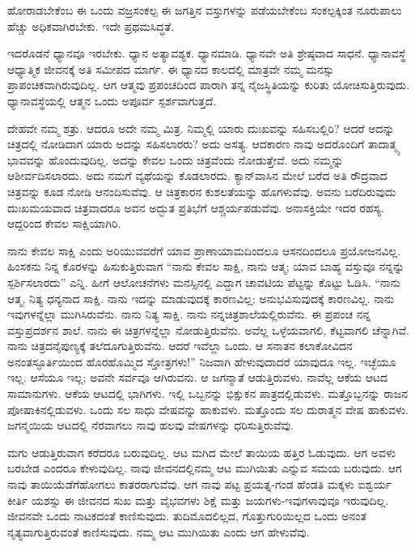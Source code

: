 \vskip 0.1cm

ಹೋರಾಡಬೇಕೆಂಬ ಈ ಒಂದು ವಜ್ರಸಂಕಲ್ಪ ಈ ಜಗತ್ತಿನ ವಸ್ತುಗಳನ್ನು ಪಡೆಯಬೇಕೆಂಬ ಸಂಕಲ್ಪಕ್ಕಿಂತ ನೂರುಪಾಲು ಹೆಚ್ಚು ಅಧಿಕವಾಗಿರಬೇಕು. ಇದೇ ಪ್ರಥಮ\break ಸಿದ್ಧತೆ.

\vskip 0.1cm

ಇದರೊಡನೆ ಧ್ಯಾನವೂ ಇರಬೇಕು. ಧ್ಯಾನ ಅತ್ಯಾವಶ್ಯಕ. ಧ್ಯಾನಮಾಡಿ. ಧ್ಯಾನವೇ ಅತಿ ಶ್ರೇಷ್ಠವಾದ ಸಾಧನೆ. ಧ್ಯಾನಾವಸ್ಥೆ ಆಧ್ಯಾತ್ಮಿಕ ಜೀವನಕ್ಕೆ ಅತಿ ಸಮೀಪದ ಮಾರ್ಗ. ಈ ಧ್ಯಾನದ ಕಾಲದಲ್ಲಿ ಮಾತ್ರವೇ ನಮ್ಮ ಮನಸ್ಸು ಪ್ರಾಪಂಚಿಕವಾಗಿರುವುದಿಲ್ಲ. ಆಗ ಆತ್ಮವು ಪ್ರಪಂಚದಿಂದ ಪಾರಾಗಿ ತನ್ನ ನೈಜಸ್ಥಿತಿಯನ್ನು ಕುರಿತು ಯೋಚಿಸುತ್ತಿರುವುದು. ಧ್ಯಾನಾವಸ್ಥೆಯಲ್ಲಿ ಆತ್ಮನ ಒಂದು ಅಪೂರ್ವ ಸ್ಪರ್ಶವಾಗುತ್ತದೆ.

\eject

ದೇಹವೇ ನಮ್ಮ ಶತ್ರು. ಆದರೂ ಅದೇ ನಮ್ಮ ಮಿತ್ರ. ನಿಮ್ಮಲ್ಲಿ ಯಾರು ದುಃಖವನ್ನು ಸಹಿಸಬಲ್ಲಿರಿ? ಆದರೆ ಅದನ್ನು ಚಿತ್ರದಲ್ಲಿ ನೋಡಿದಾಗ ಯಾರು ಅದನ್ನು ಸಹಿಸಲಾರರು? ಅದು ಅಸತ್ಯ. ಆದಕಾರಣ ನಾವು ಅದರೊಂದಿಗೆ ತಾದಾತ್ಮ್ಯ ಭಾವವನ್ನು ಹೊಂದುವುದಿಲ್ಲ. ಅದನ್ನು ಕೇವಲ ಒಂದು ಚಿತ್ರವೆಂದು ನೋಡುತ್ತೇವೆ. ಅದು ನಮ್ಮನ್ನು ಆಶೀರ್ವದಿಸಲಾರದು. ಅದು ನಮಗೆ ವ್ಯಥೆಯನ್ನು ಕೊಡಲಾರದು. ಕ್ಯಾನ್​ವಾಸಿನ ಮೇಲೆ ಬರೆದ ಅತಿ ರೌದ್ರವಾದ ಚಿತ್ರವನ್ನು ಕೂಡ ನೋಡಿ ಆನಂದಿಸುವೆವು. ಆ ಚಿತ್ರಕಾರನ ಕುಶಲತೆಯನ್ನು ಹೊಗಳುವೆವು. ಅವನು ಬರೆದಿರುವುದು ದುಃಖಮಯವಾದ ಚಿತ್ರವಾದರೂ ಅವನ ಅದ್ಭುತ ಪ್ರತಿಭೆಗೆ ಆಶ್ಚರ್ಯಪಡುವೆವು. ಅನಾಸಕ್ತಿಯೇ ಇದರ ರಹಸ್ಯ. ಆದ್ದರಿಂದ ಕೇವಲ ಸಾಕ್ಷಿಯಾಗಿರಿ.

\vskip 0.1cm

ನಾನು ಕೇವಲ ಸಾಕ್ಷಿ ಎಂದು ಅರಿಯುವವರೆಗೆ ಯಾವ ಪ್ರಾಣಾಯಾಮದಿಂದಲೂ ಆಸನದಿಂದಲೂ ಪ್ರಯೋಜನವಿಲ್ಲ. ಹಿಂಸಕನು ನಿನ್ನ ಕೊರಳನ್ನು ಹಿಸುಕುತ್ತಿರುವಾಗ “ನಾನು ಕೇವಲ ಸಾಕ್ಷಿ, ನಾನು ಆತ್ಮ; ಯಾವ ಬಾಹ್ಯ ವಸ್ತುವೂ ನನ್ನನ್ನು ಸ್ಪರ್ಶಿಸಲಾರದು” ಎನ್ನಿ. ಹೀಗೆ ಆಲೋಚನೆಗಳು ಮನಸ್ಸಿನಲ್ಲಿ ಎದ್ದಾಗ ಚಾವಟಿಯ ಪೆಟ್ಟನ್ನು ಕೊಟ್ಟು ಓಡಿಸಿ. “ನಾನು ಆತ್ಮ, ನಿತ್ಯ ಧನ್ಯನಾದ ಸಾಕ್ಷಿ. ನಾನು ಇದನ್ನು ಮಾಡುವುದಕ್ಕೆ ಕಾರಣವಿಲ್ಲ; ಅನುಭವಿಸುವು\break ದಕ್ಕೆ ಕಾರಣವಿಲ್ಲ. ನಾನು ಇವುಗಳನ್ನೆಲ್ಲಾ ಮುಗಿಸಿರುವೆನು. ನಾನು ನಿತ್ಯ ಸಾಕ್ಷಿ. ನಾನು ನನ್ನ\break ಚಿತ್ರಶಾಲೆಯಲ್ಲಿರುವೆನು. ಈ ಪ್ರಪಂಚ ನನ್ನ ವಸ್ತುಪ್ರದರ್ಶನ ಶಾಲೆ. ನಾನು ಈ ಚಿತ್ರಗಳ\break ನ್ನೆಲ್ಲಾ ನೋಡುತ್ತಿರುವೆನು. ಅವೆಲ್ಲ ಒಳ್ಳೆಯವಾಗಲಿ, ಕೆಟ್ಟವಾಗಲಿ ಚೆನ್ನಾಗಿವೆ. ನಾನು ಚಿತ್ರದ\break ನೈಪುಣ್ಯಕ್ಕೆ ತಲೆದೂಗುತ್ತಿರುವೆನು. ಆದರೆ ಇವೆಲ್ಲಾ ಒಂದು. ಆ ಸನಾತನ ಕಲಾಕೋವಿದನ ಅನಂತಸ್ಫೂರ್ತಿಯಿಂದ ಹೊರಹೊಮ್ಮಿದ ಸ್ತೋತ್ರಗಳು!” ನಿಜವಾಗಿ ಹೇಳುವುದಾದರೆ ಯಾವುದೂ ಇಲ್ಲ. ಇಚ್ಛೆಯೂ ಇಲ್ಲ. ಆಸೆಯೂ ಇಲ್ಲ; ಅವನೇ ಸರ್ವವೂ ಆಗಿರುವನು. ಆ ಜಗನ್ಮಾತೆ ಆಡುತ್ತಿರುವಳು. ನಾವೆಲ್ಲ ಆಕೆಯ ಆಟದ ಸಾಮಾನುಗಳು. ಆಕೆಯ ಆಟದಲ್ಲಿ ಭಾಗಿಗಳು. ಇಲ್ಲಿ ಒಬ್ಬನನ್ನು ಭಿಕ್ಷುಕನ ಪಾತ್ರದಲ್ಲಿಡುವಳು. ಮತ್ತೊಬ್ಬನನ್ನು ರಾಜನ ಪೋಷಾಕಿನಲ್ಲಿಡುವಳು. ಒಂದು ಸಲ ಸಾಧು ವೇಷವನ್ನು ಹಾಕುವಳು. ಮತ್ತೊಂದು ಸಲ ದುರಾತ್ಮನ ವೇಷ ಹಾಕುವಳು. ಜಗನ್ಮಯಿಯ ಆಟದಲ್ಲಿ ನೆರವಾಗಲು ನಾವು ಹಲವು ವೇಷಗಳನ್ನು ಧರಿಸುತ್ತಿರುವೆವು.

\vskip 0.1cm

ಮಗು ಆಡುತ್ತಿರುವಾಗ ಕರೆದರೂ ಬರುವುದಿಲ್ಲ. ಆಟ ಮಗಿದ ಮೇಲೆ ತಾಯಿಯ ಹತ್ತಿರ ಓಡುವುದು. ಆಗ ಅವಳು ಬರಬೇಡ ಎಂದರೂ ಕೇಳುವುದಿಲ್ಲ. ನಾವು ಜೀವನದಲ್ಲಿ\break ನಮ್ಮ ಆಟ ಮುಗಿಯಿತು ಎನ್ನುವ ಸಮಯ ಬರುವುದು. ಆಗ ನಾವು ತಾಯಿಯೆಡೆಗೆ\break ಹೋಗಲು ಕಾತರರಾಗುವೆವು. ಆಗ ನಾವು ಪಟ್ಟ ಪ್ರಯತ್ನ-ಗಂಡ ಹೆಂಡತಿ ಮಕ್ಕಳು ಐಶ್ವರ್ಯ ಕೀರ್ತಿ ಯಶಸ್ಸು ಈ ಜೀವನದ ಸುಖ ಮತ್ತು ವೈಭವಗಳು ಶಿಕ್ಷೆ ಮತ್ತು ಜಯ\break ಗಳು-ಇವುಗಳಾವುವೂ ಇರುವುದಿಲ್ಲ. ಜೀವನವೇ ಒಂದು ನಾಟಕದಂತೆ ಕಾಣಿಸುವುದು. ತುದಿಮೊದಲಿಲ್ಲದ, ಗೊತ್ತುಗುರಿಯಿಲ್ಲದ ಒಂದು ಅನಂತ ನೃತ್ಯವಾಗುತ್ತಿರುವಂತೆ ಕಾಣಿಸುವುದು. ನಮ್ಮ ಆಟ ಮುಗಿಯಿತು ಎಂದು ಆಗ ಹೇಳುವೆವು.

